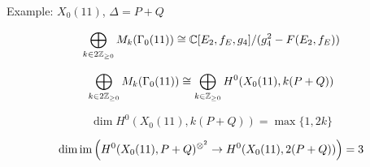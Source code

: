 \begin{frame}{Example: $X_0(11)$, $\Delta = P + Q$}

\begin{example}[LMFDB]
\[
\bigoplus_{k \in 2\mathbb{Z}_{\geq 0}} M_k(\Gamma_0(11)) \cong \mathbb{C}[E_2,f_E,g_4]/(g_4^2 -F(E_2,f_E))
\]
\end{example}

\begin{remark}
\[
\bigoplus_{k \in 2\mathbb{Z}_{\geq 0}} M_k(\Gamma_0(11)) \cong \bigoplus_{k \in \mathbb{Z}_{\geq 0}}  H^0(X_0(11), k(P+ Q))
 \]
\end{remark}

\begin{remark}
\[
\dim H^0(X_0(11), k(P+ Q)) = \max\{1,2k\}
 \]
\end{remark}


 \[
  \dim \operatorname{im} \left( H^0(X_0(11), P+ Q)^{\otimes^2}  \to H^0(X_0(11), 2(P+ Q)) \right)= 3
  \]





\end{frame}
